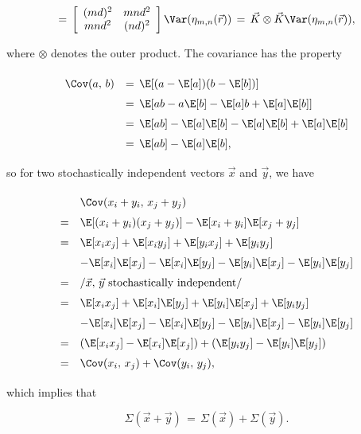 {\begin{equation}
\begin{array}{c}
=\,
\left[\renewcommand*{\arraystretch}{1}
\begin{array}{cc}
(md)^2 & mnd^2 \\
mnd^2 & (nd)^2
\end{array}
\right]
\Var(\eta_{m,n}(\vec{r})) \,=\, \vec{K}\otimes\vec{K} \Var(\eta_{m,n}(\vec{r})),
\end{array}
\end{equation}

where $\otimes$ denotes the outer product. The covariance has the property

\begin{equation}
\renewcommand*{\arraystretch}{1.5}
\begin{array}{rl}
\Cov(a,\,b)
& =\, \E[(a-\E[a])(b-\E[b])] \\
& =\, \E[ab - a\E[b] - \E[a]b + \E[a]\E[b]] \\
& =\, \E[ab] - \E[a]\E[b] - \E[a]\E[b] + \E[a]\E[b] \\
& =\, \E[ab] - \E[a]\E[b],
\end{array}
\end{equation}

so for two stochastically independent vectors $\vec{x}$ and $\vec{y}$, we have

\begin{equation}
\renewcommand*{\arraystretch}{1.5}
\begin{array}{cl}
  & \Cov(x_i+y_i,\,x_j+y_j) \\
= & \E[(x_i+y_i)(x_j+y_j)] - \E[x_i+y_i]\E[x_j+y_j] \\
= & \E[x_i x_j] + \E[x_i y_j] + \E[y_i x_j] + \E[y_i y_j] \\
  & - \E[x_i]\E[x_j] - \E[x_i]\E[y_j] - \E[y_i]\E[x_j] - \E[y_i]\E[y_j] \\
= & \left/ \vec{x},\, \vec{y}\ \text{stochastically independent}\right/ \\
= & \E[x_i x_j] + \E[x_i]\E[y_j] + \E[y_i]\E[x_j] + \E[y_i y_j] \\
  & - \E[x_i]\E[x_j] - \E[x_i]\E[y_j] - \E[y_i]\E[x_j] - \E[y_i]\E[y_j] \\
= & (\E[x_i x_j] - \E[x_i]\E[x_j]) + (\E[y_i y_j] - \E[y_i]\E[y_j]) \\
= & \Cov(x_i,\,x_j) + \Cov(y_i,\,y_j),
\end{array}
\end{equation}

which implies that

\begin{equation} \label{eq:covariance_matrix_sum}
\Sigma(\vec{x} + \vec{y}) \,=\, \Sigma(\vec{x}) + \Sigma(\vec{y}).
\end{equation}






















}
